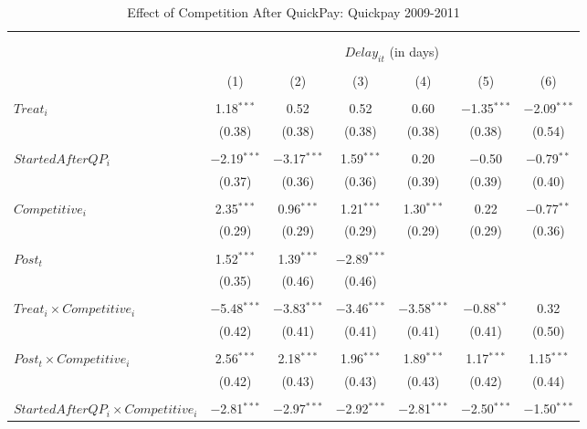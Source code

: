 \documentclass[
]{article}
\begin{document}
\begin{table}[H] \centering 
  \caption{Effect of Competition After QuickPay: Quickpay 2009-2011} 
  \label{} 
\small 
\begin{tabular}{@{\extracolsep{-3pt}}lcccccc} 
\\[-1.8ex]\hline 
\hline \\[-1.8ex] 
\\[-1.8ex] & \multicolumn{6}{c}{$Delay_{it}$ (in days)} \\ 
\\[-1.8ex] & (1) & (2) & (3) & (4) & (5) & (6)\\ 
\hline \\[-1.8ex] 
 $Treat_i$ & 1.18$^{***}$ & 0.52 & 0.52 & 0.60 & $-$1.35$^{***}$ & $-$2.09$^{***}$ \\ 
  & (0.38) & (0.38) & (0.38) & (0.38) & (0.38) & (0.54) \\ 
  & & & & & & \\ 
 $StartedAfterQP_i$ & $-$2.19$^{***}$ & $-$3.17$^{***}$ & 1.59$^{***}$ & 0.20 & $-$0.50 & $-$0.79$^{**}$ \\ 
  & (0.37) & (0.36) & (0.36) & (0.39) & (0.39) & (0.40) \\ 
  & & & & & & \\ 
 $Competitive_i$ & 2.35$^{***}$ & 0.96$^{***}$ & 1.21$^{***}$ & 1.30$^{***}$ & 0.22 & $-$0.77$^{**}$ \\ 
  & (0.29) & (0.29) & (0.29) & (0.29) & (0.29) & (0.36) \\ 
  & & & & & & \\ 
 $Post_t$ & 1.52$^{***}$ & 1.39$^{***}$ & $-$2.89$^{***}$ &  &  &  \\ 
  & (0.35) & (0.46) & (0.46) &  &  &  \\ 
  & & & & & & \\ 
 $Treat_i \times Competitive_i$ & $-$5.48$^{***}$ & $-$3.83$^{***}$ & $-$3.46$^{***}$ & $-$3.58$^{***}$ & $-$0.88$^{**}$ & 0.32 \\ 
  & (0.42) & (0.41) & (0.41) & (0.41) & (0.41) & (0.50) \\ 
  & & & & & & \\ 
 $Post_t \times Competitive_i$ & 2.56$^{***}$ & 2.18$^{***}$ & 1.96$^{***}$ & 1.89$^{***}$ & 1.17$^{***}$ & 1.15$^{***}$ \\ 
  & (0.42) & (0.43) & (0.43) & (0.43) & (0.42) & (0.44) \\ 
  & & & & & & \\ 
 $StartedAfterQP_i \times Competitive_i$ & $-$2.81$^{***}$ & $-$2.97$^{***}$ & $-$2.92$^{***}$ & $-$2.81$^{***}$ & $-$2.50$^{***}$ & $-$1.50$^{***}$ \\ 

\end{tabular}
\end{table}
\end{document}
